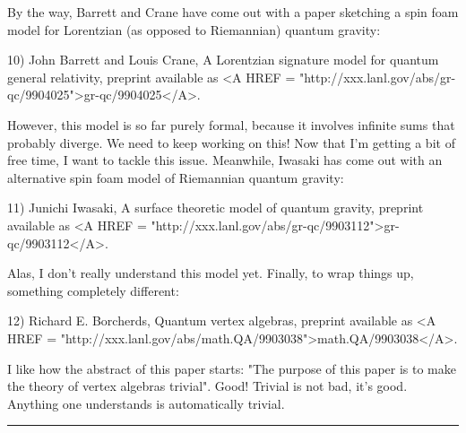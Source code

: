 By the way, Barrett and Crane have come out with a paper sketching a
spin foam model for Lorentzian (as opposed to Riemannian) quantum
gravity:

10) John Barrett and Louis Crane, A Lorentzian signature model for quantum
general relativity, preprint available as <A HREF =
"http://xxx.lanl.gov/abs/gr-qc/9904025">gr-qc/9904025</A>.

However, this model is so far purely formal, because it involves
infinite sums that probably diverge.  We need to keep working on this!
Now that I'm getting a bit of free time, I want to tackle this issue.
Meanwhile, Iwasaki has come out with an alternative spin foam model of
Riemannian quantum gravity:

11) Junichi Iwasaki, A surface theoretic model of quantum gravity, preprint
available as <A HREF =
"http://xxx.lanl.gov/abs/gr-qc/9903112">gr-qc/9903112</A>.

Alas, I don't really understand this model yet.  Finally, to wrap
things up, something completely different:

12) Richard E. Borcherds, Quantum vertex algebras, preprint available
as <A HREF = "http://xxx.lanl.gov/abs/math.QA/9903038">math.QA/9903038</A>.
 

I like how the abstract of this paper starts: "The purpose of this paper
is to make the theory of vertex algebras trivial".  Good!  Trivial is
not bad, it's good.  Anything one understands is automatically trivial.





 \par\noindent\rule{\textwidth}{0.4pt}

